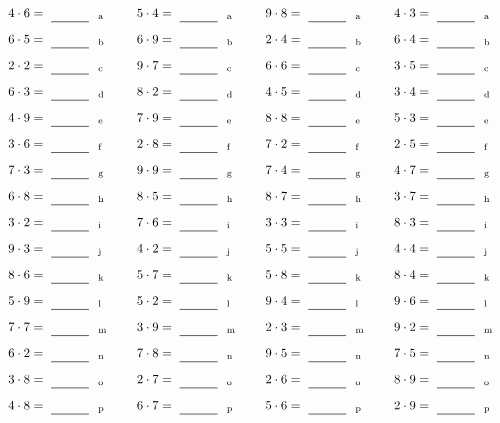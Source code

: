 \documentclass
[
  draft    = true,
  fontsize = 11pt,
  parskip  = half-
]
{scrartcl}
\begin{document}
\par\vfill\par
\begin{align*}
    \pline{4\cdot6}&=\rline{a}
  & \pline{5\cdot4}&=\rline{a}
  & \pline{9\cdot8}&=\rline{a}
  & \pline{4\cdot3}&=\rline{a} \\[1ex]
    \pline{6\cdot5}&=\rline{b}
  & \pline{6\cdot9}&=\rline{b}
  & \pline{2\cdot4}&=\rline{b}
  & \pline{6\cdot4}&=\rline{b} \\[1ex]
    \pline{2\cdot2}&=\rline{c}
  & \pline{9\cdot7}&=\rline{c}
  & \pline{6\cdot6}&=\rline{c}
  & \pline{3\cdot5}&=\rline{c} \\[1ex]
    \pline{6\cdot3}&=\rline{d}
  & \pline{8\cdot2}&=\rline{d}
  & \pline{4\cdot5}&=\rline{d}
  & \pline{3\cdot4}&=\rline{d} \\[1ex]
    \pline{4\cdot9}&=\rline{e}
  & \pline{7\cdot9}&=\rline{e}
  & \pline{8\cdot8}&=\rline{e}
  & \pline{5\cdot3}&=\rline{e} \\[1ex]
    \pline{3\cdot6}&=\rline{f}
  & \pline{2\cdot8}&=\rline{f}
  & \pline{7\cdot2}&=\rline{f}
  & \pline{2\cdot5}&=\rline{f} \\[1ex]
    \pline{7\cdot3}&=\rline{g}
  & \pline{9\cdot9}&=\rline{g}
  & \pline{7\cdot4}&=\rline{g}
  & \pline{4\cdot7}&=\rline{g} \\[1ex]
    \pline{6\cdot8}&=\rline{h}
  & \pline{8\cdot5}&=\rline{h}
  & \pline{8\cdot7}&=\rline{h}
  & \pline{3\cdot7}&=\rline{h} \\[1ex]
    \pline{3\cdot2}&=\rline{i}
  & \pline{7\cdot6}&=\rline{i}
  & \pline{3\cdot3}&=\rline{i}
  & \pline{8\cdot3}&=\rline{i} \\[1ex]
    \pline{9\cdot3}&=\rline{j}
  & \pline{4\cdot2}&=\rline{j}
  & \pline{5\cdot5}&=\rline{j}
  & \pline{4\cdot4}&=\rline{j} \\[1ex]
    \pline{8\cdot6}&=\rline{k}
  & \pline{5\cdot7}&=\rline{k}
  & \pline{5\cdot8}&=\rline{k}
  & \pline{8\cdot4}&=\rline{k} \\[1ex]
    \pline{5\cdot9}&=\rline{l}
  & \pline{5\cdot2}&=\rline{l}
  & \pline{9\cdot4}&=\rline{l}
  & \pline{9\cdot6}&=\rline{l} \\[1ex]
    \pline{7\cdot7}&=\rline{m}
  & \pline{3\cdot9}&=\rline{m}
  & \pline{2\cdot3}&=\rline{m}
  & \pline{9\cdot2}&=\rline{m} \\[1ex]
    \pline{6\cdot2}&=\rline{n}
  & \pline{7\cdot8}&=\rline{n}
  & \pline{9\cdot5}&=\rline{n}
  & \pline{7\cdot5}&=\rline{n} \\[1ex]
    \pline{3\cdot8}&=\rline{o}
  & \pline{2\cdot7}&=\rline{o}
  & \pline{2\cdot6}&=\rline{o}
  & \pline{8\cdot9}&=\rline{o} \\[1ex]
    \pline{4\cdot8}&=\rline{p}
  & \pline{6\cdot7}&=\rline{p}
  & \pline{5\cdot6}&=\rline{p}
  & \pline{2\cdot9}&=\rline{p}
\end{align*}
\end{document}
